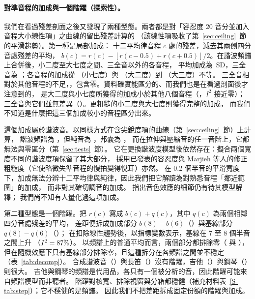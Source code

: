 \documentclass[11pt,a4paper]{article}
\newcommand{\SDu}{\,SD}
\begin{document}
\paragraph{對準音程的加成與一個階躍（探索性）。}
我們在看過殘差剖面之後又發現了兩種型態。兩者都是對「容忍度 20 音分並加入音程大小線性項」之曲線的留出殘差計算的
（該線性項吸收了第~\ref{sec:ceiling}~節的平滑趨勢）。第一種是局部加成：
十二平均律音程 $c$ 處的殘差，減去其兩側四分音處殘差的平均，
$b(c)=r(c)-[r(c-0.5)+r(c+0.5)]/2$。在諧波頻譜上合併後，小二度至大七度之間、三全音以外的各音程，
平均加成為 \decTwoBonusOther\SDu，三全音為 \decTwoBonusTT；各音程的加成從
\decTwoBMinSev{}（小七度）與 \decTwoBMajSec{}（大二度）到 \decTwoBMajThird{}（大三度）不等。
三全音相對於其他音程的不足，\decTwoOtherMinusTT，包含零。資料確實能區分的、而我們也是在看過剖面後才注意到的，
是大二度與小七度所獲得的加成小於其他八個音程（\decTwoMMvsRest，$I^2$ 接近零）；
三全音與它們並無差異（\decTwoTTvsMM）。更粗糙的小二度與大七度則獲得完整的加成，
而我們不知道是什麼把這三個加成較小的音程區分出來。

這個加成屬於諧波音。以同樣方式在含尖銳度項的曲線（第~\ref{sec:ceiling}~節）上計算，
諧波頻譜為 \gbSharpHarmOther{}，但純音為 \gbSharpPure{}，邦囊為 \gbSharpBonang，
而在拉伸與壓縮音的任一音階上，它都無法與零區分（第~\ref{sec:tests}~節）。
它在更換諧波度模型後依然存在：擬合兩個寬度不同的諧波度項保留了其大部分，
採用已發表的容忍度與 Marjieh 等人的修正粗糙度（它使略微失準音程的慢拍變得悅耳）亦然。
在 0.2 個半音的平滑寬度下，加成無法分辨十二平均律與純律，因此我們把它解讀為對熟悉音程「鄰近範圍」的加成，
而非對其確切調音的加成。\citet{marjieh2024} 指出音色效應的細節仍有待其模型解釋；
我們尚不知有人量化過這項加成。

第二種型態是一個階躍。把 $r(c)$ 寫成 $b(c)+q(c)$，其中 $q(c)$ 為兩個相鄰四分音處殘差的平均，
差距便拆成加成部分 $b(8)-b(6)$（\decTwoBonusPart）與基線部分 $q(8)-q(6)$（\decTwoBasePart）；
在扣除線性趨勢後，以指標變數表示，基線在 7 至 8 個半音之間上升 \decTwoStep{}（$I^2=87\%$）。
以頻譜上的普通平均而言，兩個部分都排除零（\decTwoBonusPartFixed{} 與 \decTwoBasePartFixed），
但在隨機效應下只有基線部分排除零，且這種拆分在各頻譜之間並不穩定（表~\ref{tab:decomp}）。
合成諧波音（\decTwoStepHarm）與長笛（\decTwoStepFlute）沒有階躍，吉他（\decTwoStepGuitar）與鋼琴（\decTwoStepPiano）則很大。
吉他與鋼琴的頻譜是代用品，各只有一個被分析的音，因此階躍可能來自頻譜模型而非聽者。
階躍對核寬、排除視窗與分箱都穩健（補充材料表~\ref{S-tab:step}）；它不穩健的是頻譜。
因此我們不把差距拆成固定份額的階躍與加成。
\end{document}
